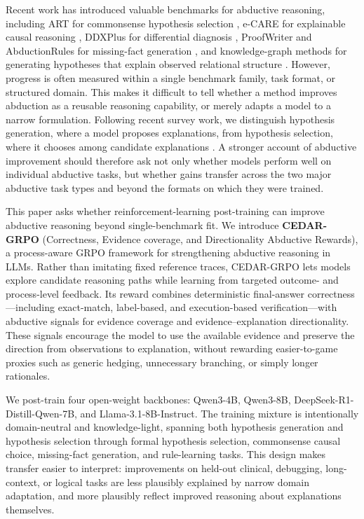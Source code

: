 \documentclass[11pt]{article}
\begin{document}
Recent work has introduced valuable benchmarks for abductive reasoning, including ART for commonsense hypothesis selection \citep{bhagavatula2019abductive-commonsense-reasoning}, e-CARE for explainable causal reasoning \citep{du2022ecare}, DDXPlus for differential diagnosis \citep{Tchango2022ddxplus}, ProofWriter and AbductionRules for missing-fact generation \citep{tafjord2020proofwriter,young2022abductionrules}, and knowledge-graph methods for generating hypotheses that explain observed relational structure \citep{bai2023abductive-kg}. However, progress is often measured within a single benchmark family, task format, or structured domain. This makes it difficult to tell whether a method improves abduction as a reusable reasoning capability, or merely adapts a model to a narrow formulation. Following recent survey work, we distinguish hypothesis generation, where a model proposes explanations, from hypothesis selection, where it chooses among candidate explanations \citep{salimi2026wiringwhyunifiedtaxonomy}. A stronger account of abductive improvement should therefore ask not only whether models perform well on individual abductive tasks, but whether gains transfer across the two major abductive task types and beyond the formats on which they were trained.

This paper asks whether reinforcement-learning post-training can improve abductive reasoning beyond single-benchmark fit. We introduce \textbf{CEDAR-GRPO} (Correctness, Evidence coverage, and Directionality Abductive Rewards), a process-aware GRPO framework for strengthening abductive reasoning in LLMs. Rather than imitating fixed reference traces, CEDAR-GRPO lets models explore candidate reasoning paths while learning from targeted outcome- and process-level feedback. Its reward combines deterministic final-answer correctness---including exact-match, label-based, and execution-based verification---with abductive signals for evidence coverage and evidence--explanation directionality. These signals encourage the model to use the available evidence and preserve the direction from observations to explanation, without rewarding easier-to-game proxies such as generic hedging, unnecessary branching, or simply longer rationales.

We post-train four open-weight backbones: Qwen3-4B, Qwen3-8B, DeepSeek-R1-Distill-Qwen-7B, and Llama-3.1-8B-Instruct. The training mixture is intentionally domain-neutral and knowledge-light, spanning both hypothesis generation and hypothesis selection through formal hypothesis selection, commonsense causal choice, missing-fact generation, and rule-learning tasks. This design makes transfer easier to interpret: improvements on held-out clinical, debugging, long-context, or logical tasks are less plausibly explained by narrow domain adaptation, and more plausibly reflect improved reasoning about explanations themselves.
\end{document}
